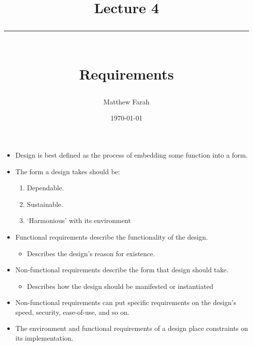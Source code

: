 \documentclass{article}
\date{
	\vspace{-.75em}
	{\large \today}
}
\title{
	\vspace*{-1.5em}
	{\Huge Lecture 4} \\
	\vspace{-1em}
	\rule{\textwidth/4}{.01em} \\
	\vspace{-.25em}
	{\Large Requirements}
	\vspace{-.75em}
}
\author{
	{\large Matthew Farah}
}
\begin{document}
\maketitle
\pagestyle{fancy}

\fi

\begin{itemize}
	\item Design is best defined as the process of embedding some function into a form.
	\item The form a design takes should be:
	\begin{enumerate}
		\item Dependable.
		\item Sustainable.
		\item `Harmonious' with its environment
	\end{enumerate}
	\item Functional requirements describe the functionality of the design.
	\begin{itemize}
		\item Describes the design's reason for existence.
	\end{itemize}
	\item Non-functional requirements describe the form that design should take.
	\begin{itemize}
		\item Describes how the design should be manifested or instantiated
	\end{itemize}
	\item Non-functional requirements can put specific requirements on the design's speed, security, ease-of-use, and so on.
	\item The environment and functional requirements of a design place constraints on its implementation.
\end{itemize}

\ifdefined\iscombined
	\newpage
\else
	
\end{document}
